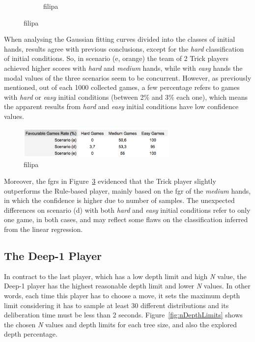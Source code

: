 \begin{figure}[h]
\begin{subfigure}[h]{0.32\textwidth}
                \caption{filipa}
                \label{fig:ADEeasy}
        \end{subfigure}
        \caption{filipa}
        \label{fig:ADE-CH}
\end{figure}

When analysing the Gaussian fitting curves divided into the classes of initial hands, results agree with previous conclusions, except for the \emph{hard} classification of initial conditions.
So, in scenario (e, orange) the team of 2 Trick players achieved higher scores with \emph{hard} and \emph{medium} hands, while with \emph{easy} hands the modal values of the three scenarios seem to be concurrent.
However, as previously mentioned, out of each 1000 collected games, a few percentage refers to games with \emph{hard} or \emph{easy} initial conditions (between 2\% and 3\% each one), which means the apparent results from \emph{hard} and \emph{easy} initial conditions have low confidence values.

\begin{figure}[h!]
  \centering
    \includegraphics[width=0.7\textwidth]{./img/5/ADE-fgr}
  \caption{filipa}
\label{fig:ADE-fgr}
\end{figure}

Moreover, the \acp{fgr} in Figure~\ref{fig:ADE-fgr} evidenced that the Trick player slightly outperforms the Rule-based player, mainly based on the \ac{fgr} of the \emph{medium} hands, in which the confidence is higher due to number of samples.
The unexpected differences on scenario (d) with both \emph{hard} and \emph{easy} initial conditions refer to only one game, in both cases, and may reflect some flaws on the classification inferred from the linear regression.



\subsection{The Deep-1 Player}

In contract to the last player, which has a low depth limit and high \emph{N} value, the Deep-1 player has the highest reasonable depth limit and lower \emph{N} values.
In other words, each time this player has to choose a move, it sets the maximum depth limit considering it has to sample at least 30 different distributions and its deliberation time must be less than 2 seconds.
Figure~\ref{fig:nDepthLimits} shows the chosen \emph{N} values and depth limits for each tree size, and also the explored depth percentage.

